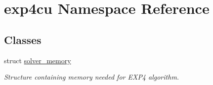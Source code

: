 \hypertarget{namespaceexp4cu}{}\section{exp4cu Namespace Reference}
\label{namespaceexp4cu}
\subsection*{Classes}
\begin{DoxyCompactItemize}
\item 
struct \hyperlink{structexp4cu_1_1solver__memory}{solver\+\_\+memory}
\begin{DoxyCompactList}\small\item\em Structure containing memory needed for E\+X\+P4 algorithm. \end{DoxyCompactList}\end{DoxyCompactItemize}
